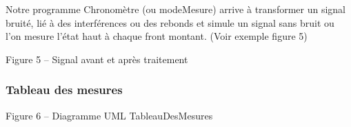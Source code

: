 Notre programme Chronomètre (ou modeMesure) arrive à transformer un signal bruité, lié à des interférences ou des rebonds et simule un signal sans bruit ou l’on mesure l’état haut à chaque front montant. (Voir exemple figure 5) 

\begin{center}
      
    Figure 5 – Signal avant et après traitement
\end{center}

\subsubsection{Tableau des mesures}
\begin{center}
      
    Figure 6 – Diagramme UML TableauDesMesures
\end{center}


